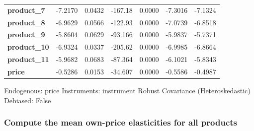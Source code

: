 \documentclass[11pt]{article}
\begin{document}
\begin{center}
\begin{tabular}{lcccccc}
\textbf{product\_7}  &      -7.2170       &       0.0432       &     -167.18     &      0.0000      &      -7.3016      &      -7.1324       \\
\textbf{product\_8}  &      -6.9629       &       0.0566       &     -122.93     &      0.0000      &      -7.0739      &      -6.8518       \\
\textbf{product\_9}  &      -5.8604       &       0.0629       &     -93.166     &      0.0000      &      -5.9837      &      -5.7371       \\
\textbf{product\_10} &      -6.9324       &       0.0337       &     -205.62     &      0.0000      &      -6.9985      &      -6.8664       \\
\textbf{product\_11} &      -5.9682       &       0.0683       &     -87.364     &      0.0000      &      -6.1021      &      -5.8343       \\
\textbf{price}       &      -0.5286       &       0.0153       &     -34.607     &      0.0000      &      -0.5586      &      -0.4987       \\
\bottomrule
\end{tabular}
\end{center}

Endogenous: price \newline
 Instruments: instrument \newline
 Robust Covariance (Heteroskedastic) \newline
 Debiased: False

    

    \subsubsection{Compute the mean own-price elasticities for all
products}\label{compute-the-mean-own-price-elasticities-for-all-products}
\end{document}
